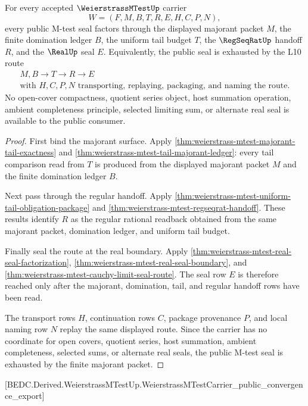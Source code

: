 \begin{theorem}
\label{thm:weierstrass-mtest-l10-finite-majorant-exhaustion}
For every accepted $\WeierstrassMTestUp$ carrier
$$
W=(F,M,B,T,R,E,H,C,P,N),
$$
every public M-test seal factors through the displayed majorant packet $M$, the
finite domination ledger $B$, the uniform tail budget $T$, the
$\RegSeqRatUp$ handoff $R$, and the $\RealUp$ seal $E$. Equivalently, the
public seal is exhausted by the L10 route
$$
\begin{gathered}
M,B \longrightarrow T \longrightarrow R \longrightarrow E
\\
\text{with } H,C,P,N \text{ transporting, replaying, packaging, and naming the route.}
\end{gathered}
$$
No open-cover compactness, quotient series object, host summation operation,
ambient completeness principle, selected limiting sum, or alternate real seal
is available to the public consumer.
\end{theorem}
\begin{proof}
First bind the majorant surface. Apply
\autoref{thm:weierstrass-mtest-majorant-tail-exactness} and
\autoref{thm:weierstrass-mtest-tail-majorant-ledger}: every tail comparison
read from $T$ is produced from the displayed majorant packet $M$ and the finite
domination ledger $B$.

Next pass through the regular handoff. Apply
\autoref{thm:weierstrass-mtest-uniform-tail-obligation-package} and
\autoref{thm:weierstrass-mtest-regseqrat-handoff}. These results identify $R$
as the regular rational readback obtained from the same majorant packet,
domination ledger, and uniform tail budget.

Finally seal the route at the real boundary. Apply
\autoref{thm:weierstrass-mtest-real-seal-factorization},
\autoref{thm:weierstrass-mtest-real-seal-boundary}, and
\autoref{thm:weierstrass-mtest-cauchy-limit-seal-route}. The seal row $E$ is
therefore reached only after the majorant, domination, tail, and regular
handoff rows have been read.

The transport rows $H$, continuation rows $C$, package provenance $P$, and
local naming row $N$ replay the same displayed route. Since the carrier has no
coordinate for open covers, quotient series, host summation, ambient
completeness, selected sums, or alternate real seals, the public M-test seal is
exhausted by the finite majorant packet.
\end{proof}

[BEDC.Derived.WeierstrassMTestUp.WeierstrassMTestCarrier\_public\_convergence\_export]

